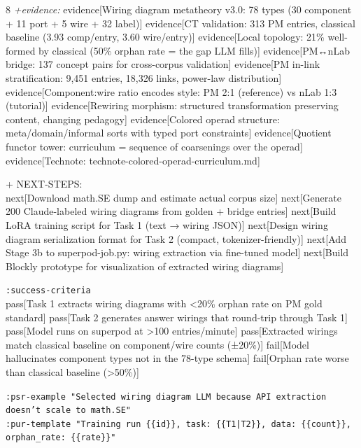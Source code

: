 \documentclass[landscape]{article}
\newcommand{\flexitag}[1]{\textcolor[gray]{0.35}{\textit{#1}}}
\begin{document}
\begin{paracol}{8}
  \flexitag{+evidence:} evidence[Wiring diagram metatheory v3.0: 78 types (30 component + 11 port + 5 wire + 32 label)] evidence[CT validation: 313 PM entries, classical baseline (3.93 comp/entry, 3.60 wire/entry)] evidence[Local topology: 21\% well-formed by classical (50\% orphan rate = the gap LLM fills)] evidence[PM↔nLab bridge: 137 concept pairs for cross-corpus validation] evidence[PM in-link stratification: 9,451 entries, 18,326 links, power-law distribution] evidence[Component:wire ratio encodes style: PM 2:1 (reference) vs nLab 1:3 (tutorial)] evidence[Rewiring morphism: structured transformation preserving content, changing pedagogy] evidence[Colored operad structure: meta/domain/informal sorts with typed port constraints] evidence[Quotient functor tower: curriculum = sequence of coarsenings over the operad] evidence[Technote: technote-colored-operad-curriculum.md]\\
\par
  + NEXT-STEPS:\\
    next[Download math.SE dump and estimate actual corpus size] next[Generate 200 Claude-labeled wiring diagrams from golden + bridge entries] next[Build LoRA training script for Task 1 (text → wiring JSON)] next[Design wiring diagram serialization format for Task 2 (compact, tokenizer-friendly)] next[Add Stage 3b to superpod-job.py: wiring extraction via fine-tuned model] next[Build Blockly prototype for visualization of extracted wiring diagrams]\\
\par
  \texttt{:\allowbreak{}success-\allowbreak{}criteria}\\
    pass[Task 1 extracts wiring diagrams with <20\% orphan rate on PM gold standard] pass[Task 2 generates answer wirings that round-trip through Task 1] pass[Model runs on superpod at >100 entries/minute] pass[Extracted wirings match classical baseline on component/wire counts (±20\%)] fail[Model hallucinates component types not in the 78-type schema] fail[Orphan rate worse than classical baseline (>50\%)]\\
\par
  \texttt{:\allowbreak{}psr-\allowbreak{}example "Selected wiring diagram LLM because API extraction doesn't scale to math.SE"}\\
  \texttt{:\allowbreak{}pur-\allowbreak{}template "Training run \{\{id\}\},\allowbreak{} task:\allowbreak{} \{\{T1|\allowbreak{}T2\}\},\allowbreak{} data:\allowbreak{} \{\{count\}\},\allowbreak{} orphan\_\allowbreak{}rate:\allowbreak{} \{\{rate\}\}"}\\

\end{paracol}
\end{document}
